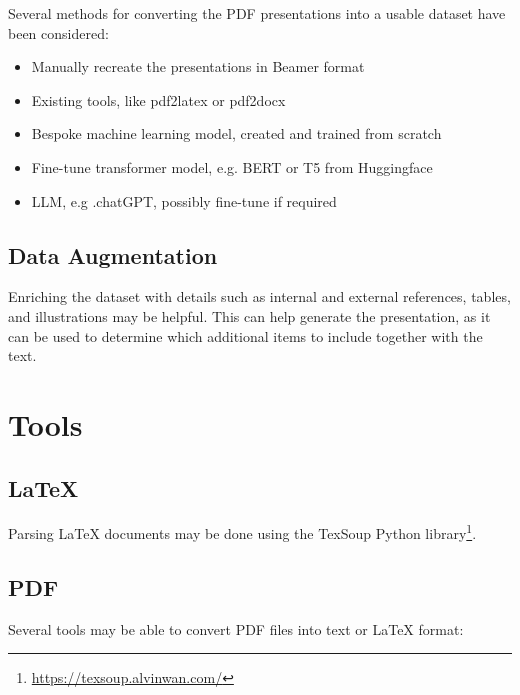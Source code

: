 Several methods for converting the PDF presentations into a usable dataset have been considered:

\begin{itemize}
    \item Manually recreate the presentations in Beamer format
    \item Existing tools, like pdf2latex or pdf2docx
    \item Bespoke machine learning model, created and trained from scratch
    \item Fine-tune transformer model, e.g. BERT or T5 from Huggingface
    \item LLM, e.g .chatGPT, possibly fine-tune if required
\end{itemize}

\subsection{Data Augmentation}
Enriching the dataset with details such as internal and external references, tables, and illustrations may be helpful. This can help generate the presentation, as it can be used to determine which additional items to include together with the text.

\section{Tools}

\subsection{\LaTeX{}}
Parsing \LaTeX{} documents may be done using the TexSoup Python library\footnote{\url{https://texsoup.alvinwan.com/}}.

\subsection{PDF}
Several tools may be able to convert PDF files into text or \LaTeX{} format: 


